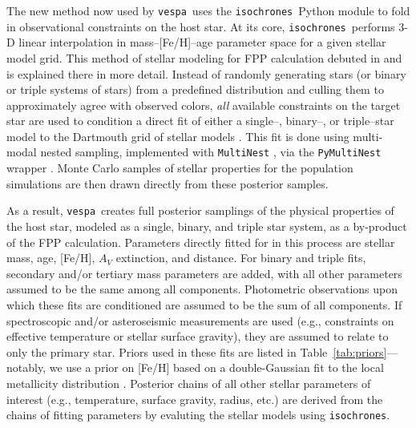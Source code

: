 \documentclass{emulateapj}
\newcommand{\Tab}[1]{Table~\ref{tab:#1}}
\newcommand{\tab}[1]{\Tab{#1}}
\newcommand{\vespa}{\texttt{vespa}}
\newcommand{\isochrones}{\texttt{isochrones}}
\begin{document}
The new method now used by \vespa\ uses the \isochrones\ Python module
\citep{isochrones} to fold in observational constraints on the host
star.  At its core, \isochrones\ performs 3-D linear interpolation in
mass--[Fe/H]--age parameter space for a given stellar model grid.
This method of stellar modeling for FPP calculation debuted in
\citet{Montet:2015} and is explained there in more detail.  Instead of
randomly generating stars (or binary or triple systems of stars) from
a predefined distribution and culling them to approximately agree with
observed colors, \emph{all} available constraints on the target star
are used to condition a direct fit of either a single--, binary--, or
triple--star model to the Dartmouth grid of stellar models
\citep{Dotter:2008, Feiden:2011}.  This fit is done using multi-modal
nested sampling, implemented with \texttt{MultiNest}
\citep{Feroz:2009, Feroz:2011, Feroz:2013}, via the
\texttt{PyMultiNest} wrapper \citep{Buchner:2014}.  Monte Carlo
samples of stellar properties for the population simulations are then
drawn directly from these posterior samples.

As a result, \vespa\ creates full posterior samplings of the physical
properties of the host star, modeled as a single, binary, and triple
star system, as a by-product of the FPP calculation.  Parameters
directly fitted for in this process are stellar mass, age, [Fe/H],
$A_V$ extinction, and distance.  For binary and triple fits, secondary
and/or tertiary mass parameters are added, with all other parameters
assumed to be the same among all components.  Photometric observations
upon which these fits are conditioned are assumed to be the sum of all
components.  If spectroscopic and/or asteroseismic measurements are
used (e.g., constraints on effective temperature or stellar surface
gravity), they are assumed to relate to only the primary star.  Priors
used in these fits are listed in \tab{priors}---notably, we
use a prior on [Fe/H] based on a double-Gaussian fit to the local
metallicity distribution \citep{Hayden:2015, Casagrande:2011}.  Posterior
chains of all other stellar parameters of interest (e.g., temperature,
surface gravity, radius, etc.) are derived from the chains of fitting
parameters by evaluting the stellar models using \isochrones.
\end{document}
